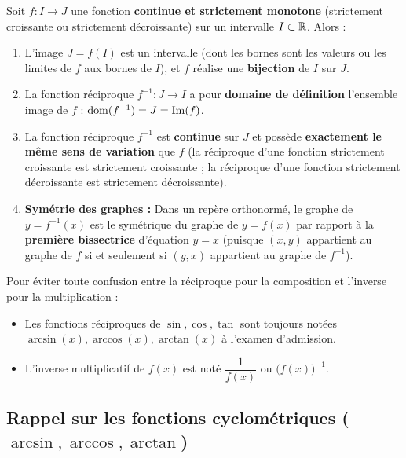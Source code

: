 \begin{theoreme}
Soit $f : I \to J$ une fonction \textbf{continue et strictement monotone} (strictement croissante ou strictement décroissante) sur un intervalle $I \subset \mathbb{R}$. Alors :
\begin{enumerate}
    \item L'image $J = f(I)$ est un intervalle (dont les bornes sont les valeurs ou les limites de $f$ aux bornes de $I$), et $f$ réalise une \textbf{bijection} de $I$ sur $J$.
    \item La fonction réciproque $f^{-1} : J \to I$ a pour \textbf{domaine de définition} l'ensemble image de $f$ : $\operatorname{dom}(f^{-1}) = J = \operatorname{Im}(f)$.
    \item La fonction réciproque $f^{-1}$ est \textbf{continue} sur $J$ et possède \textbf{exactement le même sens de variation} que $f$ (la réciproque d'une fonction strictement croissante est strictement croissante ; la réciproque d'une fonction strictement décroissante est strictement décroissante).
    \item \textbf{Symétrie des graphes :} Dans un repère orthonormé, le graphe de $y = f^{-1}(x)$ est le symétrique du graphe de $y = f(x)$ par rapport à la \textbf{première bissectrice} d'équation $y = x$ (puisque $(x, y)$ appartient au graphe de $f$ si et seulement si $(y, x)$ appartient au graphe de $f^{-1}$).
\end{enumerate}
\end{theoreme}

\begin{attention}[Ne confondez jamais la réciproque $f^{-1}(x)$ et l'inverse $\bigl(f(x)\bigr)^{-1} = \frac{1}{f(x)}$ !]
Pour éviter toute confusion entre la réciproque pour la composition et l'inverse pour la multiplication :
\begin{itemize}
    \item Les fonctions réciproques de $\sin, \cos, \tan$ sont toujours notées $\arcsin(x), \arccos(x), \arctan(x)$ à l'examen d'admission.
    \item L'inverse multiplicatif de $f(x)$ est noté $\dfrac{1}{f(x)}$ ou $\bigl(f(x)\bigr)^{-1}$.
\end{itemize}
\end{attention}

\subsection{Rappel sur les fonctions cyclométriques ($\arcsin, \arccos, \arctan$)}

